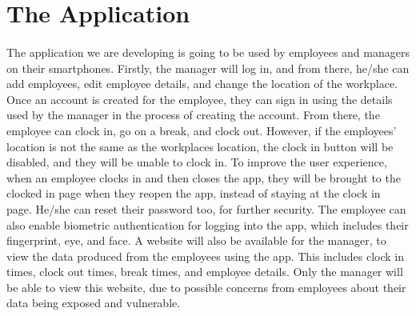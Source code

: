 \section{The Application}
\paragraph{}
The application we are developing is going to be used by employees and managers on their smartphones. Firstly, the manager will log in, and from there, he/she can add employees, edit employee details, and change the location of the workplace. Once an account is created for the employee, they can sign in using the details used by the manager in the process of creating the account. From there, the employee can clock in, go on a break, and clock out. However, if the employees' location is not the same as the workplaces location, the clock in button will be disabled, and they will be unable to clock in. To improve the user experience, when an employee clocks in and then closes the app, they will be brought to the clocked in page when they reopen the app, instead of staying at the clock in page. He/she can reset their password too, for further security. The employee can also enable biometric authentication for logging into the app, which includes their fingerprint, eye, and face. A website will also be available for the manager, to view the data produced from the employees using the app. This includes clock in times, clock out times, break times, and employee details. Only the manager will be able to view this website, due to possible concerns from employees about their data being exposed and vulnerable.
\\
\\

